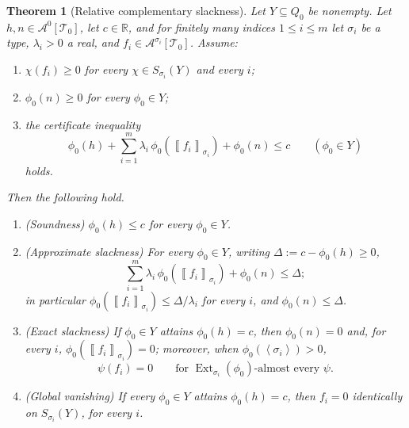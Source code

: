\documentclass[11pt]{article}
\newtheorem{theorem}{Theorem}
\theoremstyle{definition}
\newcommand{\R}{\mathbb{R}}
\newcommand{\A}{\mathcal{A}}
\newcommand{\T}{\mathcal{T}}
\newcommand{\Ext}{\operatorname{Ext}}
\newcommand{\brak}[1]{\left\langle #1\right\rangle}
\newcommand{\avg}[2]{\left\llbracket #1 \right\rrbracket_{#2}}
\begin{document}
\begin{theorem}[Relative complementary slackness]\label{thm:relative-slackness}
Let $Y\subseteq Q_0$ be nonempty.  Let $h,n\in\A^0[\T_0]$, let $c\in\R$, and for finitely
many indices $1\le i\le m$ let $\sigma_i$ be a type, $\lambda_i>0$ a real, and
$f_i\in\A^{\sigma_i}[\T_0]$.  Assume:
\begin{enumerate}[label=\textup{(\roman*)}, leftmargin=2.8em]
  \item\label{cs-hyp-supports} $\chi(f_i)\ge0$ for every $\chi\in S_{\sigma_i}(Y)$ and
  every $i$;
  \item\label{cs-hyp-slack} $\phi_0(n)\ge0$ for every $\phi_0\in Y$;
  \item\label{cs-hyp-certificate} the certificate inequality
  \[
    \phi_0(h)+\sum_{i=1}^m\lambda_i\,\phi_0(\avg{f_i}{\sigma_i})+\phi_0(n)\le c
    \qquad(\phi_0\in Y)
  \]
  holds.
\end{enumerate}
Then the following hold.
\begin{enumerate}[label=\textup{(\arabic*)}, leftmargin=2.8em]
  \item\label{cs-soundness} \textup{(Soundness)}  $\phi_0(h)\le c$ for every
  $\phi_0\in Y$.
  \item\label{cs-approx} \textup{(Approximate slackness)}  For every $\phi_0\in Y$,
  writing $\Delta:=c-\phi_0(h)\ge0$,
  \[
    \sum_{i=1}^m\lambda_i\,\phi_0(\avg{f_i}{\sigma_i})+\phi_0(n)\le\Delta;
  \]
  in particular $\phi_0(\avg{f_i}{\sigma_i})\le\Delta/\lambda_i$ for every $i$, and
  $\phi_0(n)\le\Delta$.
  \item\label{cs-exact} \textup{(Exact slackness)}  If $\phi_0\in Y$ attains
  $\phi_0(h)=c$, then $\phi_0(n)=0$ and, for every $i$,
  $\phi_0(\avg{f_i}{\sigma_i})=0$; moreover, when $\phi_0(\brak{\sigma_i})>0$,
  \[
    \psi(f_i)=0
    \qquad\text{for }\Ext_{\sigma_i}(\phi_0)\text{-almost every }\psi.
  \]
  \item\label{cs-global} \textup{(Global vanishing)}  If every $\phi_0\in Y$ attains
  $\phi_0(h)=c$, then $f_i=0$ identically on $S_{\sigma_i}(Y)$, for every $i$.
\end{enumerate}
\end{theorem}
\end{document}
